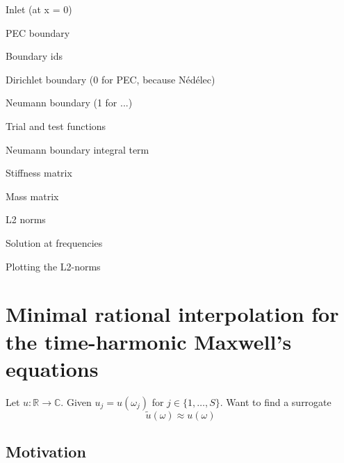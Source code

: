 \documentclass[11pt, a4paper]{article}
\begin{document}
Inlet (at x = 0)


PEC boundary


Boundary ids


Dirichlet boundary (0 for PEC, because Nédélec)


Neumann boundary (1 for ...)


Trial and test functions


Neumann boundary integral term


Stiffness matrix


Mass matrix


L2 norms


Solution at frequencies


Plotting the L2-norms



\pagebreak
\section{Minimal rational interpolation for the time-harmonic Maxwell's equations}
\label{sec:mri}

Let $u : \mathbb{R} \to \mathbb{C}$.
Given $u_j = u(\omega_j)$ for $j \in \{1, \dots, S\}$. Want to find a surrogate
\begin{equation}
    \tilde{u}(\omega) \approx u(\omega)
\end{equation}

\subsection{Motivation}
\label{subsec:motivation}
\end{document}
